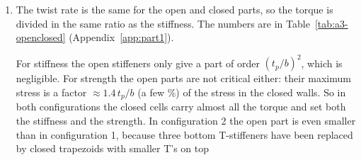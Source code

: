 \begin{enumerate}[label=\alph*., leftmargin=*]
  \emph{Strength.} Configuration 3 is about 10\,\% weaker than 1 and 2, because the flow in the middle cells is higher than in the outer cells (Question~\ref{sec:a3-4}b). Configurations 1 and 2 load the box plating almost evenly. Per unit of material, configuration 2 is the best for strength, because it uses less material than configuration 1 for the same strength.

  \item The twist rate is the same for the open and closed parts, so the torque is divided in the same ratio as the stiffness. The numbers are in Table~\ref{tab:a3-openclosed} (Appendix~\ref{app:part1}).
  
  For stiffness the open stiffeners only give a part of order $(t_p/b)^2$, which is negligible. For strength the open parts are not critical either: their maximum stress is a factor $\approx1.4\,t_p/b$ (a few \%) of the stress in the closed walls. So in both configurations the closed cells carry almost all the torque and set both the stiffness and the strength. In configuration 2 the open part is even smaller than in configuration 1, because three bottom T-stiffeners have been replaced by closed trapezoids with smaller T's on top
\end{enumerate}
